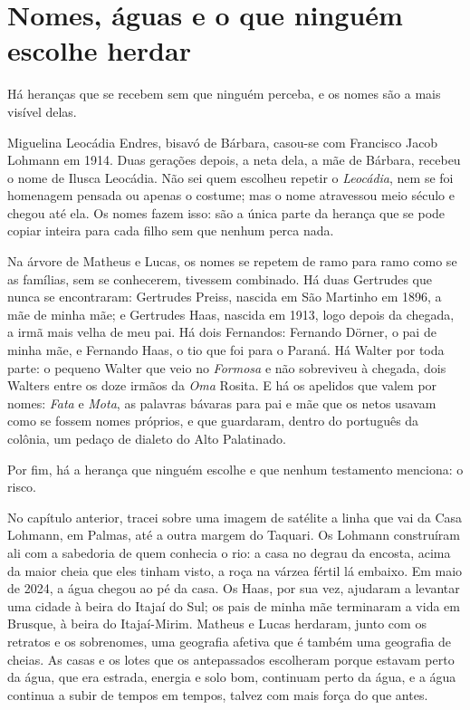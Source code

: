 \documentclass[
  brazilian,
  11pt,
  openany]{book}
\begin{document}
\section{Nomes, águas e o que ninguém escolhe
herdar}\label{nomes-uxe1guas-e-o-que-ninguuxe9m-escolhe-herdar}

Há heranças que se recebem sem que ninguém perceba, e os nomes são a
mais visível delas.

Miguelina Leocádia Endres, bisavó de Bárbara, casou-se com Francisco
Jacob Lohmann em 1914. Duas gerações depois, a neta dela, a mãe de
Bárbara, recebeu o nome de Ilusca Leocádia. Não sei quem escolheu
repetir o \emph{Leocádia}, nem se foi homenagem pensada ou apenas o
costume; mas o nome atravessou meio século e chegou até ela. Os nomes
fazem isso: são a única parte da herança que se pode copiar inteira para
cada filho sem que nenhum perca nada.

Na árvore de Matheus e Lucas, os nomes se repetem de ramo para ramo como
se as famílias, sem se conhecerem, tivessem combinado. Há duas Gertrudes
que nunca se encontraram: Gertrudes Preiss, nascida em São Martinho em
1896, a mãe de minha mãe; e Gertrudes Haas, nascida em 1913, logo depois
da chegada, a irmã mais velha de meu pai. Há dois Fernandos: Fernando
Dörner, o pai de minha mãe, e Fernando Haas, o tio que foi para o
Paraná. Há Walter por toda parte: o pequeno Walter que veio no
\emph{Formosa} e não sobreviveu à chegada, dois Walters entre os doze
irmãos da \emph{Oma} Rosita. E há os apelidos que valem por nomes:
\emph{Fata} e \emph{Mota}, as palavras bávaras para pai e mãe que os
netos usavam como se fossem nomes próprios, e que guardaram, dentro do
português da colônia, um pedaço de dialeto do Alto Palatinado.

Por fim, há a herança que ninguém escolhe e que nenhum testamento
menciona: o risco.

No capítulo anterior, tracei sobre uma imagem de satélite a linha que
vai da Casa Lohmann, em Palmas, até a outra margem do Taquari. Os
Lohmann construíram ali com a sabedoria de quem conhecia o rio: a casa
no degrau da encosta, acima da maior cheia que eles tinham visto, a roça
na várzea fértil lá embaixo. Em maio de 2024, a água chegou ao pé da
casa. Os Haas, por sua vez, ajudaram a levantar uma cidade à beira do
Itajaí do Sul; os pais de minha mãe terminaram a vida em Brusque, à
beira do Itajaí-Mirim. Matheus e Lucas herdaram, junto com os retratos e
os sobrenomes, uma geografia afetiva que é também uma geografia de
cheias. As casas e os lotes que os antepassados escolheram porque
estavam perto da água, que era estrada, energia e solo bom, continuam
perto da água, e a água continua a subir de tempos em tempos, talvez com
mais força do que antes.
\end{document}
